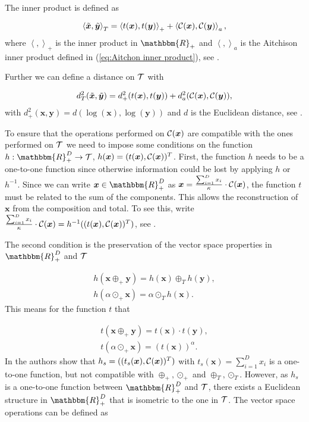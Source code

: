 The inner product is defined as 

\begin{equation}
\left\langle \tilde{\bm{x}},\tilde{\bm{y}} \right\rangle_T = \left\langle t(\bm{x}),t(\bm{y}) \right\rangle_+ + \left\langle \mathcal{C}(\bm{x}),\mathcal{C}(\bm{y}) \right\rangle_a,
\label{eq:inner product Tspace}
\end{equation}
%
where $\left\langle ,\right\rangle_+$ is the inner product in $\mathbbm{R}_+$ and $\left\langle ,\right\rangle_a$ is the Aitchison inner product defined in (\ref{eq:Aitchon inner product}), see \textcite{Pawlowsky:2013}.

Further we can define a distance on $\mathcal{T}$ with 

\begin{gather}
d_T^2(\tilde{\bm{x}},\tilde{\bm{y}}) = d_+^2(t(\bm{x}),t(\bm{y})) + d_a^2(\mathcal{C}(\bm{x}),\mathcal{C}(\bm{y})),
\label{eq:distance Tspace}
\end{gather}
%
with $d_+^2(\bm{x},\bm{y}) = d(\log(\bm{x}),\log(\bm{y}))$ and $d$ is the Euclidean distance, see \textcite{Pawlowsky:2013}. 

To ensure that the operations performed on $\mathcal{C}(\bm{x})$ are compatible with the ones performed on $\mathcal{T}$ we need to impose some conditions on the function $h:\mathbbm{R}_+^D \rightarrow \Tsp$, $h(\bm{x})=(t(\bm{x}),\mathcal{C}(\bm{x}))^T$. First, the function $h$ needs to be a one-to-one function since otherwise information could be lost by applying $h$ or $h^{-1}$. Since we can write $\bm{x} \in \mathbbm{R}_+^D$ as $\bm{x} = \frac{\sum_{i=1}^D x_i}{\kappa} \cdot \mathcal{C}(\bm{x})$, the function $t$ must be related to the sum of the components. This allows the reconstruction of $\bm{x}$ from the composition and total. To see this, write $ \frac{\sum_{i=1}^D x_i}{\kappa} \cdot \mathcal{C}(\bm{x}) = h^{-1}((t(\bm{x}),\mathcal{C}(\bm{x}))^T)$, see \textcite{Pawlowsky:2013}. 

The second condition is the preservation of the vector space properties in $\mathbbm{R}_+^D$ and $\mathcal{T}$

\begin{gather}
h(\bm{x} \oplus_+ \bm{y}) = h(\bm{x}) \oplus_T h(\bm{y}), \\
h(\alpha \odot_+ \bm{x}) = \alpha \odot_T h(\bm{x}). 
\label{eq:Vector Space Properties}
\end{gather}
%
This means for the function $t$ that 

\begin{gather}
t(\bm{x} \oplus_+ \bm{y}) = t(\bm{x}) \cdot t(\bm{y}), \\
t(\alpha \odot_+ \bm{x}) = (t(\bm{x}))^{\alpha}.
\label{eq:Vector Space Properties for t}
\end{gather}
%
In \textcite{Pawlowsky:2013} the authors show that $h_s=((t_s(\bm{x}),\mathcal{C}(\bm{x}))^T)$ with $t_s(\bm{x}) = \sum_{i=1}^D x_i$ is a one-to-one function, but not compatible with $\oplus_+,\odot_+$ and $\oplus_T,\odot_T$. However, as $h_s$ is a one-to-one function between $\mathbbm{R}_+^D$ and $\mathcal{T}$, there exists a Euclidean structure in $\mathbbm{R}_+^D$ that is isometric to the one in $\mathcal{T}$. The vector space operations can be defined as

